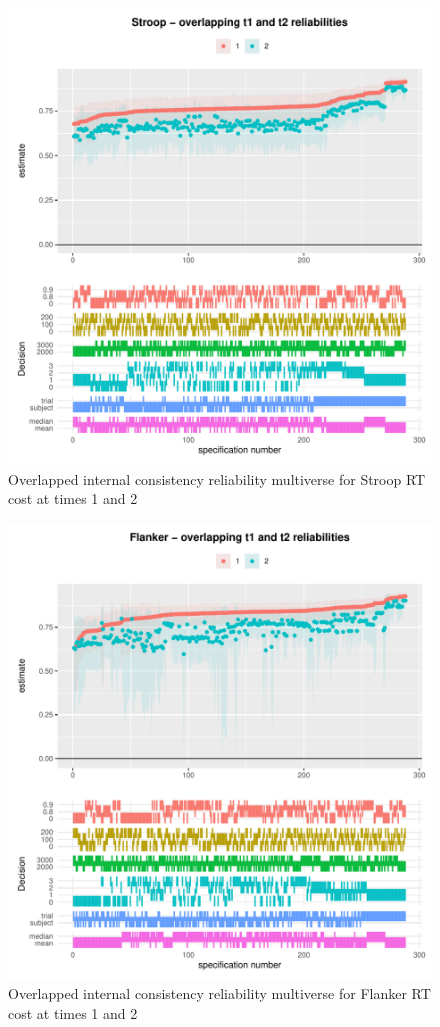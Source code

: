 \documentclass[english,man,floatsintext]{apa6}
\begin{document}
\begin{figure}
\centering
\includegraphics{Reliability_Multiverse_files/figure-latex/unnamed-chunk-11-1.pdf}
\caption{\label{fig:unnamed-chunk-11}Overlapped internal consistency reliability multiverse for Stroop RT cost at times 1 and 2}
\end{figure}

\begin{figure}
\centering
\includegraphics{Reliability_Multiverse_files/figure-latex/unnamed-chunk-12-1.pdf}
\caption{\label{fig:unnamed-chunk-12}Overlapped internal consistency reliability multiverse for Flanker RT cost at times 1 and 2}
\end{figure}
\end{document}
